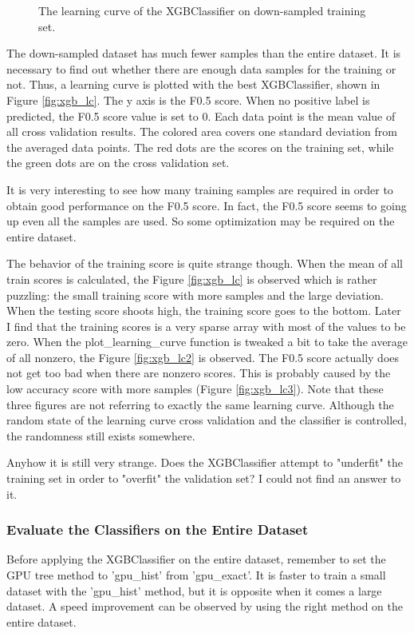 \documentclass[a4paper]{article}
\begin{document}
\begin{figure}
\begin{subfigure}[b]{0.33\textwidth}
				\end{subfigure}				
				\caption{The learning curve of the XGBClassifier on down-sampled training set.}
				\label{fig:lcs}
			\end{figure}			
			
			The down-sampled dataset has much fewer samples than the entire dataset. It is necessary to find out whether there are enough data samples for the training or not. Thus, a learning curve is plotted with the best XGBClassifier, shown in Figure \ref{fig:xgb_lc}. The y axis is the F0.5 score. When no positive label is predicted, the F0.5 score value is set to 0. Each data point is the mean value of all cross validation results. The colored area covers one standard deviation from the averaged data points. The red dots are the scores on the training set, while the green dots are on the cross validation set. 			
			
			It is very interesting to see how many training samples are required in order to obtain good performance on the F0.5 score. In fact, the F0.5 score seems to going up even all the samples are used. So some optimization may be required on the entire dataset.
			
			The behavior of the training score is quite strange though. When the mean of all train scores is calculated, the Figure \ref{fig:xgb_lc} is observed which is rather puzzling: the small training score with more samples and the large deviation. When the testing score shoots high, the training score goes to the bottom. Later I find that the training scores is a very sparse array with most of the values to be zero. When the plot\_learning\_curve function is tweaked a bit to take the average of all nonzero, the Figure \ref{fig:xgb_lc2} is observed. The F0.5 score actually does not get too bad when there are nonzero scores. This is probably caused by the low accuracy score with more samples (Figure \ref{fig:xgb_lc3}). Note that these three figures are not referring to exactly the same learning curve. Although the random state of the learning curve cross validation and the classifier is controlled, the randomness still exists somewhere.
			
			Anyhow it is still very strange. Does the XGBClassifier attempt to "underfit" the training set in order to "overfit" the validation set? I could not find an answer to it.
			
			\subsubsection{Evaluate the Classifiers on the Entire Dataset}
			Before applying the XGBClassifier on the entire dataset, remember to set the GPU tree method to 'gpu\_hist' from 'gpu\_exact'. It is faster to train a small dataset with the 'gpu\_hist' method, but it is opposite when it comes a large dataset. A speed improvement can be observed by using the right method on the entire dataset.
			
\end{document}
